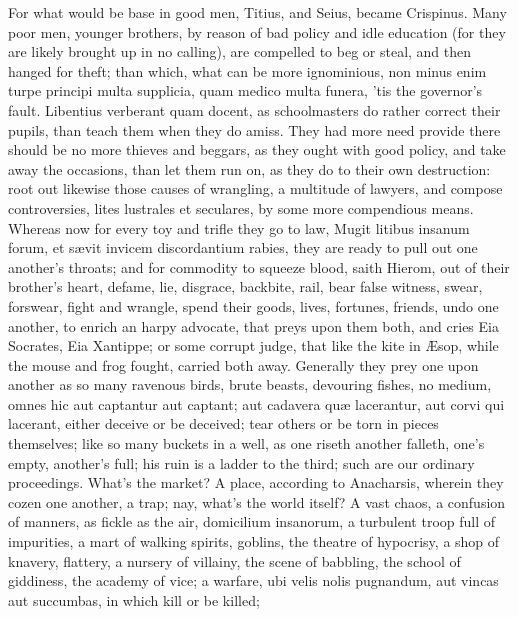 {For what would be base in good men, Titius, and Seius, became
Crispinus.
Many poor men, younger brothers, \etc{} by reason of bad policy and
idle education (for they are likely brought up in no calling), are
compelled to beg or steal, and then hanged for theft; than which, what
can be more ignominious, non minus enim turpe principi multa supplicia,
quam medico multa funera, 'tis the governor's fault. Libentius
verberant quam docent, as schoolmasters do rather correct their pupils,
than teach them when they do amiss. They had more need provide
there should be no more thieves and beggars, as they ought with good
policy, and take away the occasions, than let them run on, as they do
to their own destruction: root out likewise those causes of wrangling,
a multitude of lawyers, and compose controversies, lites lustrales et
seculares, by some more compendious means. Whereas now for every toy
and trifle they go to law, Mugit litibus insanum forum, et s\ae{}vit
invicem discordantium rabies, they are ready to pull out one another's
throats; and for commodity to squeeze blood, saith Hierom, out of
their brother's heart, defame, lie, disgrace, backbite, rail, bear
false witness, swear, forswear, fight and wrangle, spend their goods,
lives, fortunes, friends, undo one another, to enrich an harpy
advocate, that preys upon them both, and cries Eia Socrates, Eia
Xantippe; or some corrupt judge, that like the kite in \AE{}sop,
while the mouse and frog fought, carried both away. Generally they prey
one upon another as so many ravenous birds, brute beasts, devouring
fishes, no medium, omnes hic aut captantur aut captant; aut
cadavera qu\ae{} lacerantur, aut corvi qui lacerant, either deceive or be
deceived; tear others or be torn in pieces themselves; like so many
buckets in a well, as one riseth another falleth, one's empty,
another's full; his ruin is a ladder to the third; such are our
ordinary proceedings. What's the market? A place, according to
Anacharsis, wherein they cozen one another, a trap; nay, what's
the world itself? A vast chaos, a confusion of manners, as fickle
as the air, domicilium insanorum, a turbulent troop full of impurities,
a mart of walking spirits, goblins, the theatre of hypocrisy, a shop of
knavery, flattery, a nursery of villainy, the scene of babbling, the
school of giddiness, the academy of vice; a warfare, ubi velis nolis
pugnandum, aut vincas aut succumbas, in which kill or be killed;
}

